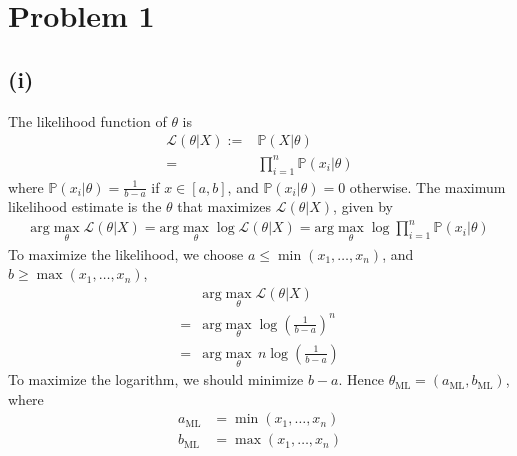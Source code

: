 \documentclass[twoside,11pt]{homework}
\date{02/21/2020}
\begin{document}
\maketitle

\section*{Problem 1} 
\subsection*{(i)}
	The likelihood function of $\theta$ is 
	\begin{align*}
		\mathcal{L}(\theta|X):=& \mathbb{P}(X|\theta) \\
		=& \prod_{i=1}^n \mathbb{P}(x_i | \theta) \tag{i.i.d.}
	\end{align*}
	where $\mathbb{P}(x_i | \theta) = \frac{1}{b-a}$ if $x\in [a,b]$, and $\mathbb{P}(x_i | \theta) = 0$ otherwise. 
	The maximum likelihood estimate is the $\theta$ that maximizes $\mathcal{L}(\theta|X)$, given by
	\begin{align*}
		 \text{arg}\max_\theta \mathcal{L}(\theta|X) 
		=  \text{arg}\max_\theta \log \mathcal{L}(\theta|X) 
		= \text{arg}\max_\theta \log \prod_{i=1}^n \mathbb{P}(x_i | \theta)
	\end{align*}
	To maximize the likelihood, we choose $a\leq \min(x_1,\dots,x_n)$, and  $b\geq \max(x_1,\dots,x_n)$,
	\begin{align*}
		& \text{arg}\max_\theta \mathcal{L}(\theta|X) \\
		= & \text{arg}\max_\theta \log \left(\frac{1}{b-a}\right)^n \\
		= & \text{arg} \max_\theta \, n \log\left(\frac{1}{b-a}\right)
	\end{align*}
	To maximize the logarithm, we should minimize $b-a$. Hence $\theta_{\text{ML}} = (a_{\text{ML}} ,b_{\text{ML}} )$, where
	\begin{align*}
		a_{\text{ML}}  &= \min(x_1,\dots,x_n) \\
		b_{\text{ML}}  &= \max(x_1,\dots,x_n)
	\end{align*}
\end{document}
